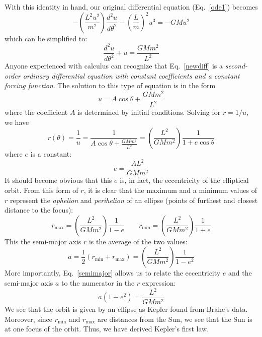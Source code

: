 \documentclass[11pt]{article}
\begin{document}
With this identity in hand, our original differential equation
(Eq.~\ref{ode1}) becomes
\begin{equation}
  -\left(\frac{L^2u^2}{m^2}\right)\frac{d^2u}{d\theta^2} - \left(\frac{L}{m}\right)^2u^3 = -GMu^2
\end{equation}
which can be simplified to:
\begin{equation}
  \frac{d^2u}{d\theta^2} + u = \frac{GMm^2}{L^2}
  \label{newdiff}
\end{equation}
Anyone experienced with calculus can recognize that Eq.\ \ref{newdiff} is a
\emph{second-order ordinary differential equation with constant coefficients
  and a constant forcing function}. The solution to this type of equation is in
the form
\begin{equation}
  u =A\cos\theta + \frac{GMm^2}{L^2}
\end{equation}
where the coefficient $A$ is determined by initial conditions. Solving for
$r=1/u$, we have
\begin{equation}
  r(\theta)=\frac{1}{u}= \frac{1}{A\cos\theta+ \frac{GMm^2}{L^2}}
  =\left(\frac{L^2}{GMm^2}\right)\frac{1}{1+e\cos\theta}
\end{equation}
where $e$ is a constant:
\begin{equation}
  e=\dfrac{AL^2}{GMm^2}
\end{equation}
It should become obvious that this $e$ is, in fact, the eccentricity of the
elliptical orbit. From this form of $r$, it is clear that the maximum and a
minimum values of $r$ represent the \emph{aphelion} and \emph{perihelion} of
an ellipse (points of furthest and closest distance to the focus):
\begin{equation}
  r_{\textrm{max}}=\left(\frac{L^2}{GMm^2}\right)\frac{1}{1-e}
  \quad\quad
  r_{\textrm{min}}=\left(\frac{L^2}{GMm^2}\right)\frac{1}{1+e}
\end{equation}
This the semi-major axis $r$ is the average of the two values:
\begin{equation}
  a=\dfrac12\left(r_\text{min} + r_\text{max}\right)=
  \left(\frac{L^2}{GMm^2}\right)\frac{1}{1-e^2}
  \label{semimajor}
\end{equation}
More importantly, Eq.\ \ref{semimajor} allows us to relate the eccentricity
$e$ and the semi-major axis $a$ to the numerator in the $r$ expression:
\begin{equation}
  a(1-e^2)=\frac{L^2}{GMm^2}
  \label{eq:numerator}
\end{equation}
We see that the orbit is given by an ellipse as Kepler found from Brahe's
data. Moreover, since $r_\mathrm{min}$ and $r_\mathrm{max}$ are distances from
the Sun, we see that the Sun is at one focus of the orbit. Thus, we have
derived Kepler's first law.
\end{document}
